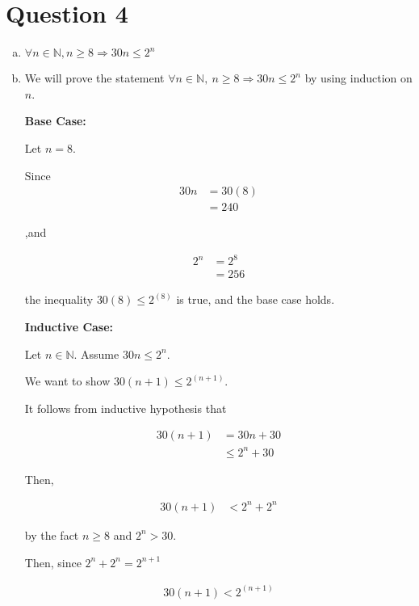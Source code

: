 \documentclass[12pt]{article}
\begin{document}
\section*{Question 4}
\begin{enumerate}[a.]
    \item

    $\forall n \in \mathbb{N}, n \geq 8 \Rightarrow 30n \leq 2^n$

    \item

    We will prove the statement $\forall n \in \mathbb{N},\:n \geq 8 \Rightarrow
    30n \leq 2^n$ by using induction on $n$.

    \bigskip

    \textbf{Base Case:}

    \bigskip

    Let $n=8$.

    \bigskip

    Since
    \setcounter{equation}{0}
    \begin{align}
        30n &= 30(8)\\
        &= 240
    \end{align}

    ,and

    \begin{align}
        2^n &= 2^8\\
        &= 256
    \end{align}

    the inequality $30(8) \leq 2^{(8)}$ is true, and the base case holds.

    \bigskip

    \textbf{Inductive Case:}

    \bigskip

    Let $n \in \mathbb{N}$. Assume $30n \leq 2^n$.

    \bigskip

    We want to show $30(n+1) \leq 2^{(n+1)}$.

    \bigskip

    It follows from inductive hypothesis that

    \begin{align}
        30(n+1) &= 30n + 30\\
        &\leq 2^n + 30
    \end{align}

    \bigskip

    Then,

    \begin{align}
        30(n+1) &< 2^n + 2^n
    \end{align}

    by the fact $n \geq 8$ and $2^n > 30$.

    \bigskip

    Then, since $2^n + 2^n = 2^{n+1}$

    \begin{align}
        30(n+1) < 2^{(n+1)}
    \end{align}

\end{enumerate}
\end{document}
